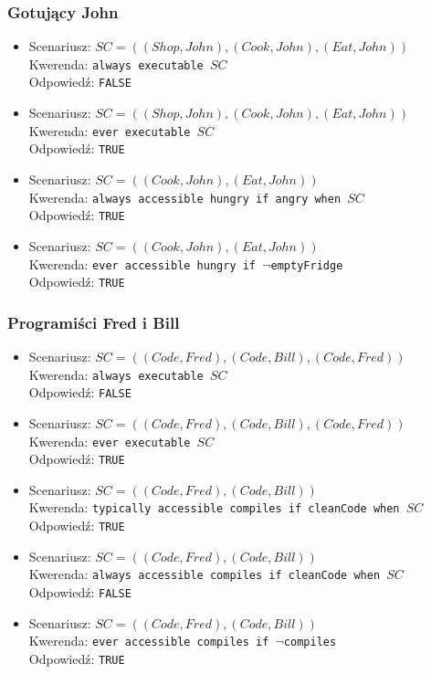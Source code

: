 \documentclass{article}
\begin{document}
\subsubsection{Gotujący John}
\begin{itemize}
\item
Scenariusz: $SC=((Shop,John),(Cook,John),(Eat,John))$\\
Kwerenda: {\large\texttt{always executable $SC$}}\\
Odpowiedź: \texttt{FALSE}
\item
Scenariusz: $SC=((Shop,John),(Cook,John),(Eat,John))$\\
Kwerenda: {\large\texttt{ever executable $SC$}}\\
Odpowiedź: \texttt{TRUE}

\item
Scenariusz: $SC=((Cook,John),(Eat,John))$\\
Kwerenda: {\large\texttt{always accessible hungry if angry when $SC$}}\\
Odpowiedź: \texttt{TRUE}

\item
Scenariusz: $SC=((Cook,John),(Eat,John))$\\
Kwerenda: {\large\texttt{ever accessible hungry if $\neg$emptyFridge}}\\
Odpowiedź: \texttt{TRUE}

\end{itemize}
\subsubsection{Programiści Fred i Bill}
\begin{itemize}
\item
Scenariusz: $SC=((Code,Fred),(Code,Bill),(Code,Fred))$\\
Kwerenda: {\large\texttt{always executable $SC$}}\\
Odpowiedź: \texttt{FALSE}
\item
Scenariusz: $SC=((Code,Fred),(Code,Bill),(Code,Fred))$\\
Kwerenda: {\large\texttt{ever executable $SC$}}\\
Odpowiedź: \texttt{TRUE}
\item
Scenariusz: $SC=((Code,Fred),(Code,Bill))$\\
Kwerenda: {\large\texttt{typically accessible compiles if cleanCode when $SC$}}\\
Odpowiedź: \texttt{TRUE}
\item
Scenariusz: $SC=((Code,Fred),(Code,Bill))$\\
Kwerenda: {\large\texttt{always accessible compiles if cleanCode when $SC$}}\\
Odpowiedź: \texttt{FALSE}
\item
Scenariusz: $SC=((Code,Fred),(Code,Bill))$\\
Kwerenda: {\large\texttt{ever accessible compiles if $\neg$compiles}}\\
Odpowiedź: \texttt{TRUE}
\end{itemize}
\end{document}

